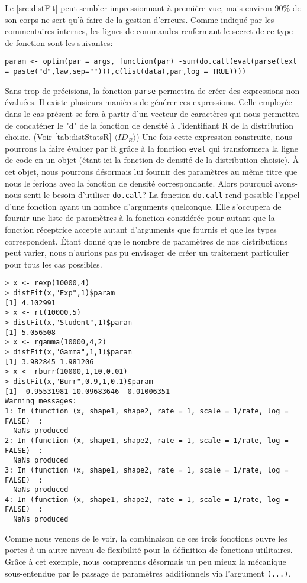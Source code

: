 Le \autoref{src:distFit} peut sembler impressionnant à première vue, mais environ 90\% de son corps ne sert qu'à faire de la gestion d'erreurs. Comme indiqué par les commentaires internes, les lignes de commandes renfermant le secret de ce type de fonction sont les suivantes: \\

\begin{minipage}{\linewidth}
	\noindent
	\texttt{param <- optim(par = args, function(par) -sum(do.call(eval(parse(text = paste("d",law,sep=""))),c(list(data),par,log = TRUE))))}
\end{minipage}

\vspace{\baselineskip}
Sans trop de précisions, la fonction \texttt{parse} permettra de créer des expressions non-évaluées. Il existe plusieurs manières de générer ces expressions. Celle employée dans le cas présent se fera à partir d'un vecteur de caractères qui nous permettra de concaténer le "d" de la fonction de densité à l'identifiant R de la distribution choisie. (Voir \autoref{tab:distStatsR} $\langle ID_R \rangle$) Une fois cette expression construite, nous pourrons la faire évaluer par R grâce à la fonction \texttt{eval} qui transformera la ligne de code en un objet (étant ici la fonction de densité de la distribution choisie). À cet objet, nous pourrons désormais lui fournir des paramètres au même titre que nous le ferions avec la fonction de densité correspondante. Alors pourquoi avons-nous senti le besoin d'utiliser \texttt{do.call}? La fonction \texttt{do.call} rend possible l'appel d'une fonction ayant un nombre d'arguments quelconque. Elle s'occupera de fournir une liste de paramètres à la fonction considérée pour autant que la fonction réceptrice accepte autant d'arguments que fournis et que les types correspondent. Étant donné que le nombre de paramètres de nos distributions peut varier, nous n'aurions pas pu envisager de créer un traitement particulier pour tous les cas possibles.

\begin{lstlisting}[caption = Exemple d'utilisation de la fonction \texttt{distFit},label=src:distFitEx]
> x <- rexp(10000,4)
> distFit(x,"Exp",1)$param
[1] 4.102991
> x <- rt(10000,5)
> distFit(x,"Student",1)$param
[1] 5.056508
> x <- rgamma(10000,4,2)
> distFit(x,"Gamma",1,1)$param
[1] 3.982845 1.981206
> x <- rburr(10000,1,10,0.01)
> distFit(x,"Burr",0.9,1,0.1)$param
[1]  0.95531981 10.09683646  0.01006351
Warning messages:
1: In (function (x, shape1, shape2, rate = 1, scale = 1/rate, log = FALSE)  :
  NaNs produced
2: In (function (x, shape1, shape2, rate = 1, scale = 1/rate, log = FALSE)  :
  NaNs produced
3: In (function (x, shape1, shape2, rate = 1, scale = 1/rate, log = FALSE)  :
  NaNs produced
4: In (function (x, shape1, shape2, rate = 1, scale = 1/rate, log = FALSE)  :
  NaNs produced
\end{lstlisting}

Comme nous venons de le voir, la combinaison de ces trois fonctions ouvre les portes à un autre niveau de flexibilité pour la définition de fonctions utilitaires. Grâce à cet exemple, nous comprenons désormais un peu mieux la mécanique sous-entendue par le passage de paramètres additionnels via l'argument \texttt{(...)}.